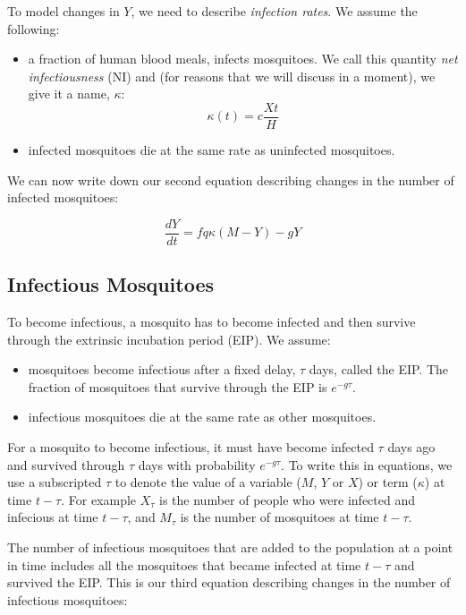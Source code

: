 \documentclass[
]{book}
\begin{document}
To model changes in \(Y\), we need to describe \emph{infection rates}. We assume the following:

\begin{itemize}
\item
  a fraction of human blood meals, infects mosquitoes. We call this quantity \emph{net infectiousness} (NI) and (for reasons that we will discuss in a moment), we give it a name, \(\kappa\): \[\kappa(t) = c \frac{X{t}}{H}\]
\item
  infected mosquitoes die at the same rate as uninfected mosquitoes.
\end{itemize}

We can now write down our second equation describing changes in the number of infected mosquitoes:

\begin{equation}
\frac{dY}{dt} = f q \kappa (M-Y) -g Y
\end{equation}

\hypertarget{infectious-mosquitoes}{%
\subsection{Infectious Mosquitoes}\label{infectious-mosquitoes}}

To become infectious, a mosquito has to become infected and then survive through the extrinsic incubation period (EIP). We assume:

\begin{itemize}
\item
  mosquitoes become infectious after a fixed delay, \(\tau\) days, called the EIP. The fraction of mosquitoes that survive through the EIP is \(e^{-g \tau}\).
\item
  infectious mosquitoes die at the same rate as other mosquitoes.
\end{itemize}

For a mosquito to become infectious, it must have become infected \(\tau\) days ago and survived through \(\tau\) days with probability \(e^{-g\tau}\). To write this in equations, we use a subscripted \(\tau\) to denote the value of a variable (\(M\), \(Y\) or \(X\)) or term (\(\kappa\)) at time \(t-\tau\). For example \(X_\tau\) is the number of people who were infected and infecious at time \(t-\tau\), and \(M_\tau\) is the number of mosquitoes at time \(t-\tau\).

The number of infectious mosquitoes that are added to the population at a point in time includes all the mosquitoes that became infected at time \(t-\tau\) and survived the EIP. This is our third equation describing changes in the number of infectious mosquitoes:
\end{document}
